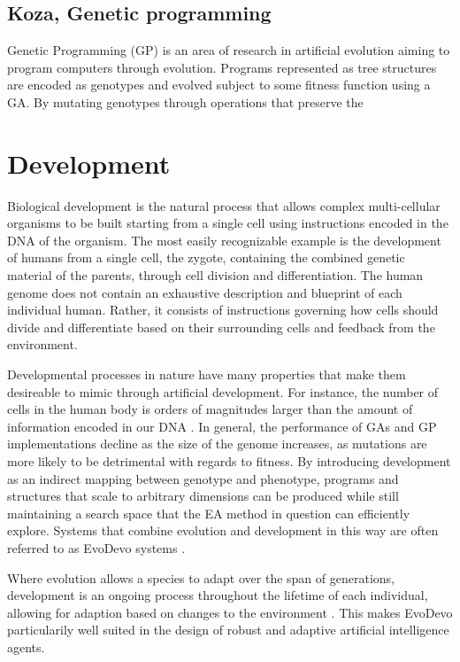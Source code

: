 \subsection{Koza, Genetic programming}

Genetic Programming (GP) is an area of research in artificial evolution aiming
to program computers through evolution. Programs represented as tree structures
are encoded as genotypes and evolved subject to some fitness function using a
GA. By mutating genotypes through operations that preserve the 

\section{Development}

Biological development is the natural process that allows complex multi-cellular
organisms to be built starting from a single cell using instructions encoded in
the DNA of the organism. The most easily recognizable example is the development
of humans from a single cell, the zygote, containing the combined genetic
material of the parents, through cell division and differentiation. The human
genome does not contain an exhaustive description and blueprint of each
individual human. Rather, it consists of instructions governing how cells should
divide and differentiate based on their surrounding cells and feedback from the
environment.

Developmental processes in nature have many properties that make them desireable
to mimic through artificial development. For instance, the number of cells in
the human body is orders of magnitudes larger than the amount of information
encoded in our DNA \cite{Bianconi2013}. In general, the performance of GAs and
GP implementations decline as the size of the genome increases, as mutations are
more likely to be detrimental with regards to fitness. By introducing
development as an indirect mapping between genotype and phenotype, programs and
structures that scale to arbitrary dimensions can be produced while still
maintaining a search space that the EA method in question can efficiently
explore. Systems that combine evolution and development in this way are often
referred to as EvoDevo systems \cite{Hall2003}.

Where evolution allows a species to adapt over the span of generations,
development is an ongoing process throughout the lifetime of each individual,
allowing for adaption based on changes to the environment \cite{Tufte2008}. This makes EvoDevo
particularily well suited in the design of robust and adaptive artificial
intelligence agents.

